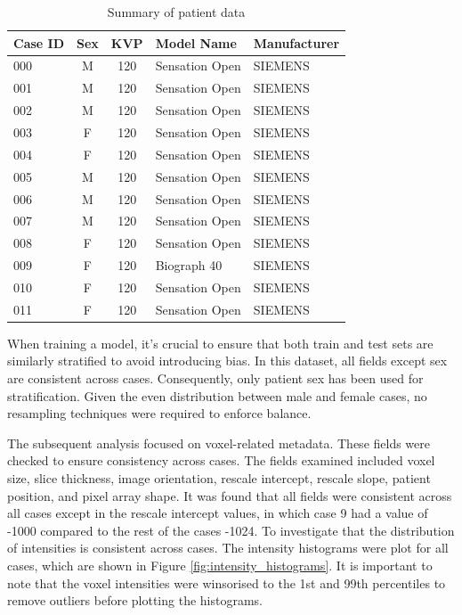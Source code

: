 \documentclass[11pt]{article}
\begin{document}
\begin{table}[h]
    \centering
    \begin{tabular}{|l|c|c|l|l|}
    \hline
    \textbf{Case ID} & \textbf{Sex} & \textbf{KVP} & \textbf{Model Name} & \textbf{Manufacturer} \\ \hline
    000 & M & 120 & Sensation Open & SIEMENS \\ \hline
    001 & M & 120 & Sensation Open & SIEMENS \\ \hline
    002 & M & 120 & Sensation Open & SIEMENS \\ \hline
    003 & F & 120 & Sensation Open & SIEMENS \\ \hline
    004 & F & 120 & Sensation Open & SIEMENS \\ \hline
    005 & M & 120 & Sensation Open & SIEMENS \\ \hline
    006 & M & 120 & Sensation Open & SIEMENS \\ \hline
    007 & M & 120 & Sensation Open & SIEMENS \\ \hline
    008 & F & 120 & Sensation Open & SIEMENS \\ \hline
    009 & F & 120 & Biograph 40 & SIEMENS \\ \hline
    010 & F & 120 & Sensation Open & SIEMENS \\ \hline
    011 & F & 120 & Sensation Open & SIEMENS \\ \hline
    \end{tabular}
    \caption{Summary of patient data}
    \label{tab:patient_meta}
\end{table}

When training a model, it's crucial to ensure that both train and test sets are similarly stratified to avoid introducing bias. In this dataset, all fields except sex are consistent across cases. Consequently, only patient sex has been used for stratification. Given the even distribution between male and female cases, no resampling techniques were required to enforce balance.

The subsequent analysis focused on voxel-related metadata. These fields were checked to ensure consistency across cases. The fields examined included voxel size, slice thickness, image orientation, rescale intercept, rescale slope, patient position, and pixel array shape. It was found that all fields were consistent across all cases except in the rescale intercept values, in which case 9 had a value of -1000 compared to the rest of the cases -1024. To investigate that the distribution of intensities is consistent across cases. The intensity histograms were plot for all cases, which are shown in Figure \ref{fig:intensity_histograms}. It is important to note that the voxel intensities were winsorised to the 1st and 99th percentiles to remove outliers before plotting the histograms.
\end{document}
